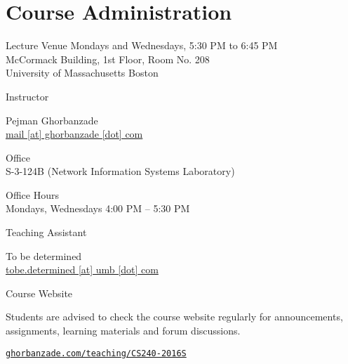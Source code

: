 \documentclass[compress]{beamer}
\begin{document}
\prepareCover

\section{Course Administration}

\begin{slide}
	\begin{block}{Lecture Venue}
		Mondays and Wednesdays, 5:30 PM to 6:45 PM\\
		McCormack Building, 1st Floor, Room No. 208\\
		University of Massachusetts Boston
	\end{block}
\end{slide}

\begin{slide}
	\begin{block}{Instructor}

	Pejman Ghorbanzade\\
	\href{mailto:mail@ghorbanzade.com}{mail [at] ghorbanzade [dot] com}

	\par
	\vspace{0.5em}
	{\large Office}\\S-3-124B (Network Information Systems Laboratory)

	\par
	\vspace{0.5em}
	{\large Office Hours}\\Mondays, Wednesdays 4:00 PM -- 5:30 PM

	\end{block}
\end{slide}

\begin{slide}
	\begin{block}{Teaching Assistant}

	To be determined\\
	\href{mailto:tobe.determined@umb.edu}{tobe.determined [at] umb [dot] com}

	\end{block}
\end{slide}

\begin{slide}
	\begin{block}{Course Website}

	Students are advised to check the course website regularly for announcements, assignments, learning materials and forum discussions.

	\begin{center}
		\href{http://ghorbanzade.com/teaching/cs240-2016s}{\texttt{ghorbanzade.com/teaching/CS240-2016S}}
	\end{center}

	\end{block}
\end{slide}
\end{document}
